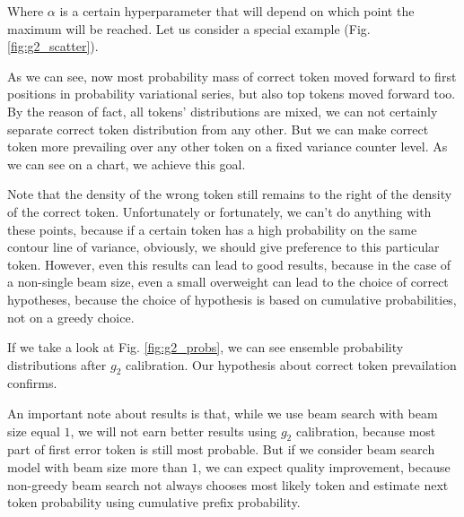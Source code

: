 \documentclass[a4paper,14pt]{extarticle}
\begin{document}
	 Where $\alpha$ is a certain hyperparameter that will depend on which point the maximum will be reached. Let us consider a special example (Fig. \ref{fig:g2_scatter}).
	
	As we can see, now most probability mass of correct token moved forward to first positions in probability variational series, but also top tokens moved forward too. By the reason of fact, all tokens' distributions are mixed, we can not certainly separate correct token distribution from any other. But we can make correct token more prevailing over any other token on a fixed variance counter level. As we can see on a chart, we achieve this goal.
	
	Note that the density of the wrong token still remains to the right of the density of the correct token. Unfortunately or fortunately, we can't do anything with these points, because if a certain token has a high probability on the same contour line of variance, obviously, we should give preference to this particular token. However, even this results can lead to good results, because in the case of a non-single beam size, even a small overweight can lead to the choice of correct hypotheses, because the choice of hypothesis is based on cumulative probabilities, not on a greedy choice.
	
	If we take a look at Fig. \ref{fig:g2_probs}, we can see ensemble probability distributions after $g_2$ calibration. Our hypothesis about correct token prevailation confirms.
	
	An important note about results is that, while we use beam search with beam size equal $1$, we will not earn better results using $g_2$ calibration, because most part of first error token is still most probable. But if we consider beam search model with beam size more than $1$, we can expect quality improvement, because non-greedy beam search not always chooses most likely token and estimate next token probability using cumulative prefix probability.
\end{document}
